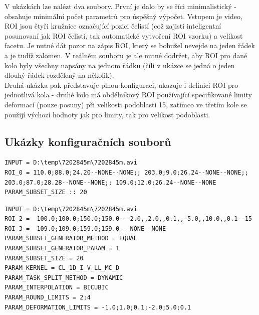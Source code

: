 \documentclass[a4paper,12pt]{article}
\begin{document}
V ukázkách lze nalézt dva soubory. První je dalo by se říci minimalistický - obsahuje minimální počet parametrů pro úspěšný výpočet. Vstupem je video, ROI jsou čtyři kružnice označující pozici čelistí (což zajistí inteligentní posunovaní jak ROI čelistí, tak automatické vytvoření ROI vzorku) a velikost facetu. Je nutné dát pozor na zápis ROI, který se bohužel nevejde na jeden řádek a je tudíž zalomen. V reálném souboru je ale nutné dodržet, aby ROI pro dané kolo byly všechny napsány na jednom řádku (čili v ukázce se jedná o jeden dlouhý řádek rozdělený na několik).\\
Druhá ukázka pak představuje plnou konfiguraci, ukazuje i definici ROI pro jednotlivá kola - druhé kolo má obdélníkový ROI používající specifikované limity deformací (pouze posuny) při velikosti podoblasti 15, zatímco ve třetím kole se použijí výchozí hodnoty jak pro limity, tak pro velikost podoblasti.
\newpage
\subsection{Ukázky konfiguračních souborů}
\label{sec:configExample}
\begin{lstlisting}[title=Jednoduchý konfigurační soubor pro automatický výpočet]
INPUT = D:\temp\7202845m\7202845m.avi
ROI_0 = 110.0;88.0;24.20--NONE--NONE;; 203.0;9.0;26.24--NONE--NONE;; 203.0;87.0;28.28--NONE--NONE;; 109.0;12.0;26.24--NONE--NONE
PARAM_SUBSET_SIZE :: 20
\end{lstlisting}
\begin{lstlisting}[title=Plný konfigurační soubor pro automatický výpočet]
INPUT = D:\temp\7202845m\7202845m.avi
ROI_2 =  100.0;100.0;150.0;150.0---2.0,,2.0,,0.1,,-5.0,,10.0,,0.1--15
ROI_3 =  109.0;109.0;159.0;159.0---NONE--NONE
PARAM_SUBSET_GENERATOR_METHOD = EQUAL
PARAM_SUBSET_GENERATOR_PARAM = 1
PARAM_SUBSET_SIZE = 20
PARAM_KERNEL = CL_1D_I_V_LL_MC_D
PARAM_TASK_SPLIT_METHOD = DYNAMIC
PARAM_INTERPOLATION = BICUBIC
PARAM_ROUND_LIMITS = 2;4
PARAM_DEFORMATION_LIMITS = -1.0;1.0;0.1;-2.0;5.0;0.1
\end{lstlisting}
\end{document}
